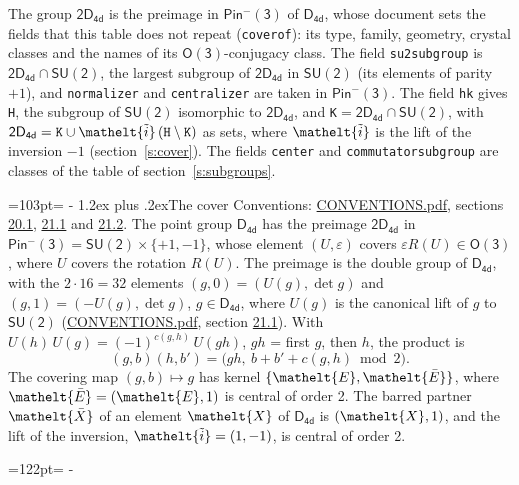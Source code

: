 \documentclass[10pt,a4paper]{article}
\makeatletter
\renewcommand\section{\@startsection{section}{1}{\z@}{-3ex plus -1ex minus -.2ex}%
  {1.2ex plus .2ex}{\normalfont\large\sffamily\bfseries\color{parttitle}}}
\newcommand{\needspace}[1]{\par\penalty-100\begingroup\dimen0=#1\relax\dimen2=\pagegoal
  \advance\dimen2-\pagetotal\ifdim\dimen0>\dimen2\relax\ifdim\dimen2>0pt\vfil\break\fi\fi
  \endgroup}
\numberwithin{equation}{section}
\newcommand{\eltfont}[1]{{\let\sigma\eltsigma\mathelt{#1}}}
\newcommand{\grp}[1]{\mathsf{#1}}
\newcommand{\elt}[1]{\eltfont{#1}}
\newcommand{\dirprod}{\times}
\newcommand{\barred}[1]{\bar{#1}}
\newcommand{\lift}[1]{\tilde{#1}}
\makeatother
\begin{document}
\leavevmode\label{n:element.inversion}\label{n:group.preimage}The group $\grp{2D_{4d}}$ is the preimage in $\grp{Pin^{-}(3)}$ of \href{../../../rotation/data/pdf/D4d.pdf}{$\grp{D_{4d}}$}, whose document sets the fields that this table does not repeat (\texttt{coverof}): its type, family, geometry, crystal classes and the names of its \href{../../../rotation/data/pdf/O3.pdf}{$\grp{O(3)}$}-conjugacy class. The field \texttt{su2subgroup} is $\grp{2D_{4d}} \cap \grp{SU(2)}$, the largest subgroup of $\grp{2D_{4d}}$ in $\grp{SU(2)}$ (its elements of parity $+1$), and \texttt{normalizer} and \texttt{centralizer} are taken in $\grp{Pin^{-}(3)}$. The field \texttt{hk} gives \texttt{H}, the subgroup of $\grp{SU(2)}$ isomorphic to $\grp{2D_{4d}}$, and \texttt{K}${} = \grp{2D_{4d}} \cap \grp{SU(2)}$, with $\grp{2D_{4d}} = \texttt{K} \cup \elt{\lift{i}}\,(\texttt{H} \setminus \texttt{K})$ as sets, where $\elt{\lift{i}}$ is the lift of the inversion $-1$ (section~\ref{s:cover}). The fields \texttt{center} and \texttt{commutatorsubgroup} are classes of the table of section~\ref{s:subgroups}.
\needspace{103pt}
\section{The cover}\label{s:cover}
Conventions: \href{../../CONVENTIONS.pdf}{CONVENTIONS.pdf}, sections \href{../../CONVENTIONS.pdf\#conv.20.1}{20.1}, \href{../../CONVENTIONS.pdf\#conv.21.1}{21.1} and \href{../../CONVENTIONS.pdf\#conv.21.2}{21.2}.
\leavevmode\label{n:group.pin.minus}\label{n:group.su2}\label{n:local.pin.sign}\label{n:matrix.covered}\label{n:matrix.lift.su2}\label{n:index.bar}The point group $\grp{D_{4d}}$ has the preimage $\grp{2D_{4d}}$ in $\grp{Pin^{-}(3)} = \grp{SU(2)} \dirprod \{+1, -1\}$, whose element $(U, \varepsilon)$ covers $\varepsilon R(U) \in \grp{O(3)}$, where $U$ covers the rotation $R(U)$. The preimage is the double group of $\grp{D_{4d}}$, with the $2 \cdot 16 = 32$ elements $(g, 0) = (U(g), \det g)$ and $(g, 1) = (-U(g), \det g)$, $g \in \grp{D_{4d}}$, where $U(g)$ is the canonical lift of $g$ to $\grp{SU(2)}$ (\href{../../CONVENTIONS.pdf}{CONVENTIONS.pdf}, section \href{../../CONVENTIONS.pdf\#conv.21.1}{21.1}). \label{n:function.cocycle}With $U(h)\,U(g) = (-1)^{c(g,h)}\,U(gh)$, $gh$ = first $g$, then $h$, the product is
\begin{equation}\label{e:product}(g, b)(h, b') = \bigl(gh,\ b + b' + c(g, h) \bmod 2\bigr).\end{equation}
\leavevmode\label{n:mark.bar}The covering map $(g, b) \mapsto g$ has kernel $\{\elt{E}, \elt{\barred{E}}\}$, where $\elt{\barred{E}} = (\elt{E}, 1)$ is central of order 2. \label{n:element.named}\label{n:mark.lift}The barred partner $\elt{\barred{X}}$ of an element $\elt{X}$ of $\grp{D_{4d}}$ is $(\elt{X}, 1)$, and the lift of the inversion, $\elt{\lift{i}} = (1, -1)$, is central of order 2.
\needspace{122pt}
\end{document}
